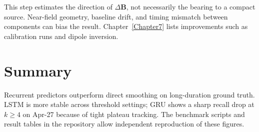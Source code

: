 This step estimates the direction of $\Delta\mathbf{B}$, not necessarily the bearing to a compact source. Near-field geometry, baseline drift, and timing mismatch between components can bias the result. Chapter~\ref{Chapter7} lists improvements such as calibration runs and dipole inversion.

\section*{Summary}
Recurrent predictors outperform direct smoothing on long-duration ground truth. LSTM is more stable across threshold settings; GRU shows a sharp recall drop at $k \ge 4$ on Apr-27 because of tight plateau tracking. The benchmark scripts and result tables in the repository allow independent reproduction of these figures.
